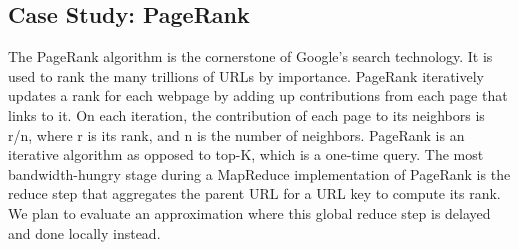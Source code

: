 \subsection{Case Study: PageRank}

The PageRank algorithm is the cornerstone of Google’s search technology. It is used to rank the many trillions of URLs by importance. PageRank iteratively updates a rank for each webpage by adding up contributions from each page that links to it. On each iteration, the contribution of each page to its neighbors is r/n, where r is its rank, and n is the number of neighbors.
PageRank is an iterative algorithm as opposed to top-K, which is a one-time query. The most bandwidth-hungry stage during a MapReduce implementation of PageRank is the reduce step that aggregates the parent URL for a URL key to compute its rank. We plan to evaluate an approximation where this global reduce step is delayed and done locally instead. 

